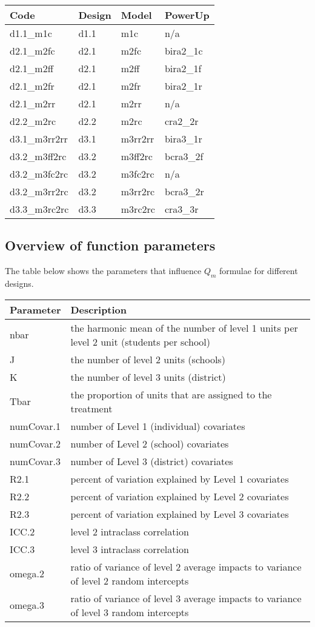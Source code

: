 \documentclass[
]{article}
\begin{document}
\begin{tabular}{l|l|l|l}
\hline
Code & Design & Model & PowerUp\\
\hline
d1.1\_m1c & d1.1 & m1c & n/a\\
\hline
d2.1\_m2fc & d2.1 & m2fc & bira2\_1c\\
\hline
d2.1\_m2ff & d2.1 & m2ff & bira2\_1f\\
\hline
d2.1\_m2fr & d2.1 & m2fr & bira2\_1r\\
\hline
d2.1\_m2rr & d2.1 & m2rr & n/a\\
\hline
d2.2\_m2rc & d2.2 & m2rc & cra2\_2r\\
\hline
d3.1\_m3rr2rr & d3.1 & m3rr2rr & bira3\_1r\\
\hline
d3.2\_m3ff2rc & d3.2 & m3ff2rc & bcra3\_2f\\
\hline
d3.2\_m3fc2rc & d3.2 & m3fc2rc & n/a\\
\hline
d3.2\_m3rr2rc & d3.2 & m3rr2rc & bcra3\_2r\\
\hline
d3.3\_m3rc2rc & d3.3 & m3rc2rc & cra3\_3r\\
\hline
\end{tabular}

\subsection{Overview of function parameters}
\label{sec:params}

The table below shows the parameters that influence \(Q_m\) formulae for
different designs.

\begin{tabular}{l|l}
\hline
Parameter & Description\\
\hline
nbar & the harmonic mean of the number of level 1 units per level 2 unit (students per school)\\
\hline
J & the number of level 2 units (schools)\\
\hline
K & the number of level 3 units (district)\\
\hline
Tbar & the proportion of units that are assigned to the treatment\\
\hline
numCovar.1 & number of Level 1 (individual) covariates\\
\hline
numCovar.2 & number of Level 2 (school) covariates\\
\hline
numCovar.3 & number of Level 3 (district) covariates\\
\hline
R2.1 & percent of variation explained by Level 1 covariates\\
\hline
R2.2 & percent of variation explained by Level 2 covariates\\
\hline
R2.3 & percent of variation explained by Level 3 covariates\\
\hline
ICC.2 & level 2 intraclass correlation\\
\hline
ICC.3 & level 3 intraclass correlation\\
\hline
omega.2 & ratio of variance of level 2 average impacts to variance of level 2 random intercepts\\
\hline
omega.3 & ratio of variance of level 3 average impacts to variance of level 3 random intercepts\\
\hline
\end{tabular}
\end{document}
